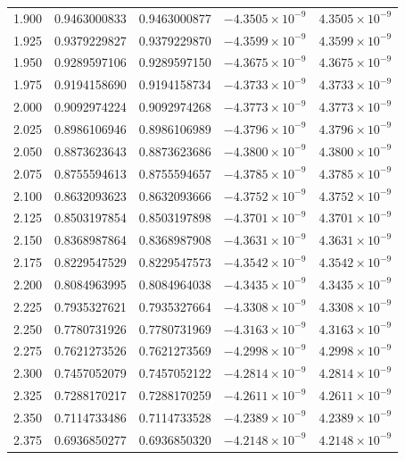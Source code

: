 \documentclass[11pt,a4paper]{article}
\begin{document}
\begin{longtable}{rrrrr}
1.900 & 0.9463000833 & 0.9463000877 & $-4.3505\times 10^{-9}$ & $4.3505\times 10^{-9}$ \\
1.925 & 0.9379229827 & 0.9379229870 & $-4.3599\times 10^{-9}$ & $4.3599\times 10^{-9}$ \\
1.950 & 0.9289597106 & 0.9289597150 & $-4.3675\times 10^{-9}$ & $4.3675\times 10^{-9}$ \\
1.975 & 0.9194158690 & 0.9194158734 & $-4.3733\times 10^{-9}$ & $4.3733\times 10^{-9}$ \\
2.000 & 0.9092974224 & 0.9092974268 & $-4.3773\times 10^{-9}$ & $4.3773\times 10^{-9}$ \\
2.025 & 0.8986106946 & 0.8986106989 & $-4.3796\times 10^{-9}$ & $4.3796\times 10^{-9}$ \\
2.050 & 0.8873623643 & 0.8873623686 & $-4.3800\times 10^{-9}$ & $4.3800\times 10^{-9}$ \\
2.075 & 0.8755594613 & 0.8755594657 & $-4.3785\times 10^{-9}$ & $4.3785\times 10^{-9}$ \\
2.100 & 0.8632093623 & 0.8632093666 & $-4.3752\times 10^{-9}$ & $4.3752\times 10^{-9}$ \\
2.125 & 0.8503197854 & 0.8503197898 & $-4.3701\times 10^{-9}$ & $4.3701\times 10^{-9}$ \\
2.150 & 0.8368987864 & 0.8368987908 & $-4.3631\times 10^{-9}$ & $4.3631\times 10^{-9}$ \\
2.175 & 0.8229547529 & 0.8229547573 & $-4.3542\times 10^{-9}$ & $4.3542\times 10^{-9}$ \\
2.200 & 0.8084963995 & 0.8084964038 & $-4.3435\times 10^{-9}$ & $4.3435\times 10^{-9}$ \\
2.225 & 0.7935327621 & 0.7935327664 & $-4.3308\times 10^{-9}$ & $4.3308\times 10^{-9}$ \\
2.250 & 0.7780731926 & 0.7780731969 & $-4.3163\times 10^{-9}$ & $4.3163\times 10^{-9}$ \\
2.275 & 0.7621273526 & 0.7621273569 & $-4.2998\times 10^{-9}$ & $4.2998\times 10^{-9}$ \\
2.300 & 0.7457052079 & 0.7457052122 & $-4.2814\times 10^{-9}$ & $4.2814\times 10^{-9}$ \\
2.325 & 0.7288170217 & 0.7288170259 & $-4.2611\times 10^{-9}$ & $4.2611\times 10^{-9}$ \\
2.350 & 0.7114733486 & 0.7114733528 & $-4.2389\times 10^{-9}$ & $4.2389\times 10^{-9}$ \\
2.375 & 0.6936850277 & 0.6936850320 & $-4.2148\times 10^{-9}$ & $4.2148\times 10^{-9}$ \\

\end{longtable}
\end{document}
